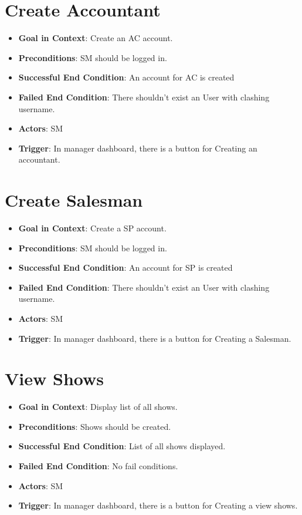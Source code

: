 \documentclass{scrreprt}
\begin{document}
\section{Create Accountant}
\begin{itemize}
\item \textbf{Goal in Context}: Create an AC account.
\item \textbf{Preconditions}: SM should be logged in.
\item \textbf{Successful End Condition}: An account for AC is created
\item \textbf{Failed End Condition}: There shouldn't exist an User with clashing username.
\item \textbf{Actors}: SM
\item \textbf{Trigger}: In manager dashboard, there is a button for Creating an accountant.
\end{itemize}

\section{Create Salesman}
\begin{itemize}
\item \textbf{Goal in Context}: Create a SP account.
\item \textbf{Preconditions}: SM should be logged in.
\item \textbf{Successful End Condition}: An account for SP is created
\item \textbf{Failed End Condition}: There shouldn't exist an User with clashing username.
\item \textbf{Actors}: SM
\item \textbf{Trigger}: In manager dashboard, there is a button for Creating a Salesman.
\end{itemize}

\section{View Shows}
\begin{itemize}
\item \textbf{Goal in Context}: Display list of all shows.
\item \textbf{Preconditions}: Shows should be created.
\item \textbf{Successful End Condition}: List of all shows displayed.
\item \textbf{Failed End Condition}: No fail conditions.
\item \textbf{Actors}: SM
\item \textbf{Trigger}: In manager dashboard, there is a button for Creating a view shows.
\end{itemize}
\end{document}
